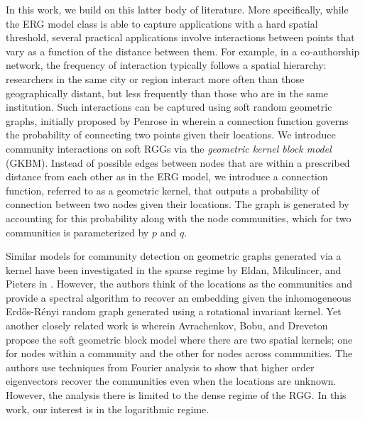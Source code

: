 \documentclass[letterpaper,11pt]{article}
\theoremstyle{definition}
\newcommand{\Renyi}{R{\'e}nyi\xspace}
\numberwithin{equation}{section}
\theoremstyle{definition}
\newcommand{\Renyi}{R{\'e}nyi\xspace}
\numberwithin{equation}{section}
\theoremstyle{thmstyletwo}%
\begin{document}
In this work, we build on this latter body of literature. More specifically, while the ERG model class 
is able to capture applications with a hard spatial threshold, several practical applications involve interactions between points that vary as a function of the distance between them. For example, in a co-authorship network, the frequency of interaction typically follows a spatial hierarchy: researchers in the same city or region interact more often than those geographically distant, but less frequently than those who are in the same institution. Such interactions can be captured using soft random geometric graphs, initially proposed by Penrose in \cite{penrose2016connectivity} wherein a connection function governs the probability of connecting two points given their locations. We introduce community interactions on soft RGGs via the \emph{geometric kernel block model} (GKBM). Instead of possible edges between nodes that are within a prescribed distance from each other as in the ERG model, we introduce a connection function, referred to as a geometric kernel, that outputs a probability of connection between two nodes given their locations. The graph is generated by accounting for this probability along with the node communities, which for two communities is parameterized by $p$ and $q$.


Similar models for community detection on geometric graphs generated via a kernel have been investigated in the sparse regime by Eldan, Mikulincer, and Pieters in \cite{eldan2022community}. However, the authors think of the locations as the communities and provide a spectral algorithm to recover an embedding given the inhomogeneous Erd\H{o}s-\Renyi random graph generated using a rotational invariant kernel. Yet another closely related work is \cite{avrachenkov2021higher} wherein Avrachenkov, Bobu, and Dreveton propose the soft geometric block model where there are two spatial kernels; one for nodes within a community and the other for nodes across communities. The authors use techniques from Fourier analysis to show that higher order eigenvectors recover the communities even when the locations are unknown. However, the analysis there is limited to the dense regime of the RGG. In this work, our interest is in the logarithmic regime.
\end{document}

